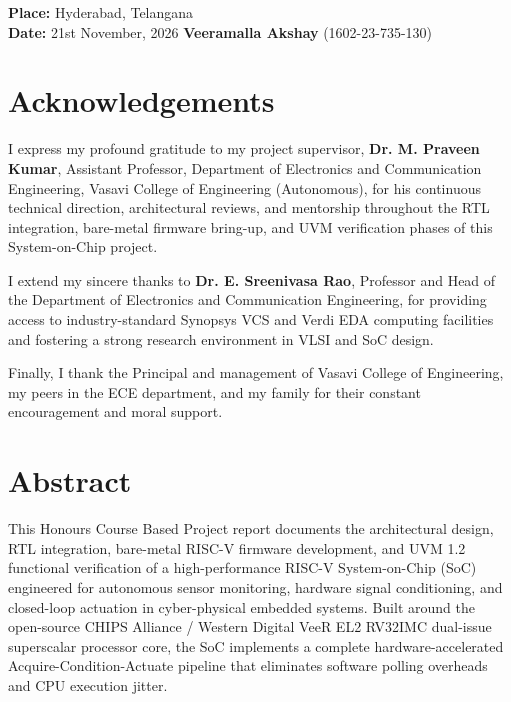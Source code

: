 \documentclass[12pt,a4paper,oneside]{report}
\begin{document}
\vspace{3cm}
\noindent
\textbf{Place:} Hyderabad, Telangana\\
\textbf{Date:} 21st November, 2026 \hfill \textbf{Veeramalla Akshay} (1602-23-735-130)

\newpage
\chapter*{Acknowledgements}
I express my profound gratitude to my project supervisor, \textbf{Dr. M. Praveen Kumar}, Assistant Professor, Department of Electronics and Communication Engineering, Vasavi College of Engineering (Autonomous), for his continuous technical direction, architectural reviews, and mentorship throughout the RTL integration, bare-metal firmware bring-up, and UVM verification phases of this System-on-Chip project.

I extend my sincere thanks to \textbf{Dr. E. Sreenivasa Rao}, Professor and Head of the Department of Electronics and Communication Engineering, for providing access to industry-standard Synopsys VCS and Verdi EDA computing facilities and fostering a strong research environment in VLSI and SoC design.

Finally, I thank the Principal and management of Vasavi College of Engineering, my peers in the ECE department, and my family for their constant encouragement and moral support.

\newpage
\chapter*{Abstract}
This Honours Course Based Project report documents the architectural design, RTL integration, bare-metal RISC-V firmware development, and UVM 1.2 functional verification of a high-performance RISC-V System-on-Chip (SoC) engineered for autonomous sensor monitoring, hardware signal conditioning, and closed-loop actuation in cyber-physical embedded systems. Built around the open-source CHIPS Alliance / Western Digital VeeR EL2 RV32IMC dual-issue superscalar processor core, the SoC implements a complete hardware-accelerated Acquire-Condition-Actuate pipeline that eliminates software polling overheads and CPU execution jitter.
\end{document}
